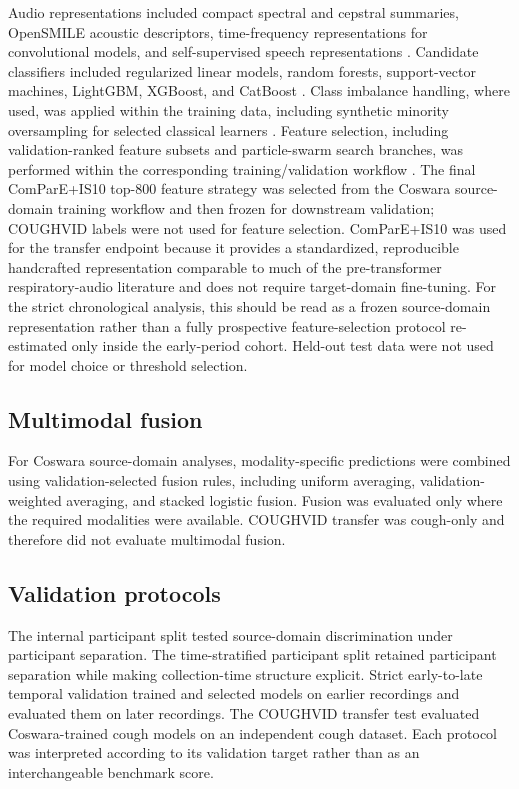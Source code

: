 \documentclass[11pt]{article}
\begin{document}
Audio representations included compact spectral and cepstral summaries, OpenSMILE acoustic descriptors, time-frequency representations for convolutional models, and self-supervised speech representations \citep{eyben2010opensmile,schuller2010paralinguistic,schuller2016compare,chen2022wavlm}. Candidate classifiers included regularized linear models, random forests, support-vector machines, LightGBM, XGBoost, and CatBoost \citep{breiman2001random,cortes1995support,ke2017lightgbm,chen2016xgboost,prokhorenkova2018catboost}. Class imbalance handling, where used, was applied within the training data, including synthetic minority oversampling for selected classical learners \citep{chawla2002smote}. Feature selection, including validation-ranked feature subsets and particle-swarm search branches, was performed within the corresponding training/validation workflow \citep{kennedy1995pso}. The final ComParE+IS10 top-800 feature strategy was selected from the Coswara source-domain training workflow and then frozen for downstream validation; COUGHVID labels were not used for feature selection. ComParE+IS10 was used for the transfer endpoint because it provides a standardized, reproducible handcrafted representation comparable to much of the pre-transformer respiratory-audio literature and does not require target-domain fine-tuning. For the strict chronological analysis, this should be read as a frozen source-domain representation rather than a fully prospective feature-selection protocol re-estimated only inside the early-period cohort. Held-out test data were not used for model choice or threshold selection.

\subsection*{Multimodal fusion}

For Coswara source-domain analyses, modality-specific predictions were combined using validation-selected fusion rules, including uniform averaging, validation-weighted averaging, and stacked logistic fusion. Fusion was evaluated only where the required modalities were available. COUGHVID transfer was cough-only and therefore did not evaluate multimodal fusion.

\subsection*{Validation protocols}

The internal participant split tested source-domain discrimination under participant separation. The time-stratified participant split retained participant separation while making collection-time structure explicit. Strict early-to-late temporal validation trained and selected models on earlier recordings and evaluated them on later recordings. The COUGHVID transfer test evaluated Coswara-trained cough models on an independent cough dataset. Each protocol was interpreted according to its validation target rather than as an interchangeable benchmark score.
\end{document}
